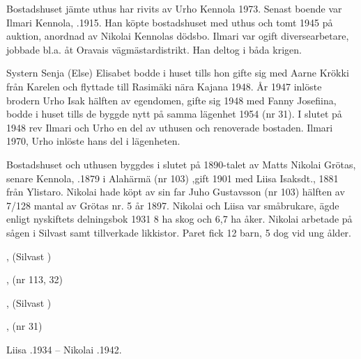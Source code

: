 Bostadshuset jämte uthus har rivits av Urho Kennola 1973. Senast boende var Ilmari Kennola, .1915. Han köpte bostadshuset med uthus och tomt 1945 på auktion, anordnad av Nikolai Kennolas dödsbo. Ilmari var ogift diversearbetare, jobbade bl.a. åt Oravais vägmästardistrikt. Han deltog i båda krigen.

Systern Senja (Else) Elisabet bodde i huset tills hon gifte sig med Aarne Krökki från Karelen och flyttade till Rasimäki nära Kajana 1948. År 1947 inlöste brodern Urho Isak hälften av egendomen, gifte sig 1948 med Fanny Josefiina, bodde i  huset tills de byggde nytt på samma lägenhet 1954 (nr 31). I slutet på 1948 rev Ilmari och Urho en del av uthusen och  renoverade bostaden.
Ilmari  1970, Urho inlöste hans del i lägenheten.


Bostadshuset och uthusen byggdes i slutet på 1890-talet av Matts Nikolai Grötas, senare Kennola, .1879 i Alahärmä (nr 103) ,gift 1901 med Liisa Isaksdt.,  1881 från Ylistaro. Nikolai hade köpt av sin far Juho Gustavsson (nr 103) hälften av 7/128 mantal av Grötas nr. 5 år 1897. Nikolai och Liisa var småbrukare, ägde enligt nyskiftets delningsbok 1931 8 ha skog och 6,7 ha åker. Nikolai arbetade på sågen i Silvast samt tillverkade likkistor. Paret fick 12 barn, 5 dog vid ung ålder.
\begin{jhchildren}
  \item {}
  \item {}
  \item {}
  \item {}
  \item {}, (Silvast    )
  \item {}, (nr 113, 32)
  \item {}
  \item {}, (Silvast   )
  \item {}
  \item {}
  \item {}, (nr 31)
  \item {}
\end{jhchildren}
Liisa .1934  --  Nikolai .1942.



